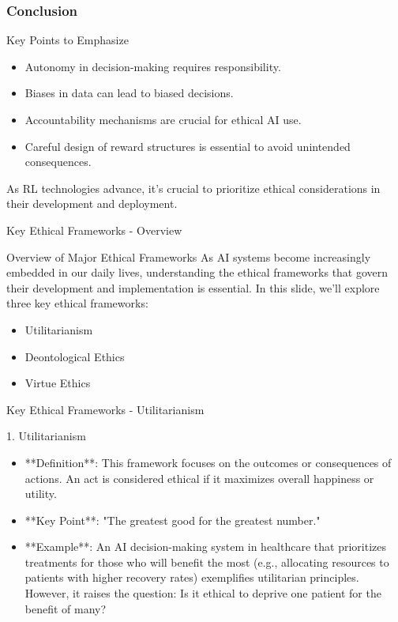 \documentclass[aspectratio=169]{beamer}
\begin{document}
\begin{frame}[fragile]
    \frametitle{Conclusion}
    \begin{block}{Key Points to Emphasize}
        \begin{itemize}
            \item Autonomy in decision-making requires responsibility.
            \item Biases in data can lead to biased decisions.
            \item Accountability mechanisms are crucial for ethical AI use.
            \item Careful design of reward structures is essential to avoid unintended consequences.
        \end{itemize}
    \end{block}
    As RL technologies advance, it's crucial to prioritize ethical considerations in their development and deployment.
\end{frame}

\begin{frame}[fragile]{Key Ethical Frameworks - Overview}
    \begin{block}{Overview of Major Ethical Frameworks}
        As AI systems become increasingly embedded in our daily lives, understanding the ethical frameworks that govern their development and implementation is essential. In this slide, we'll explore three key ethical frameworks: 
        \begin{itemize}
            \item Utilitarianism
            \item Deontological Ethics
            \item Virtue Ethics
        \end{itemize}
    \end{block}
\end{frame}

\begin{frame}[fragile]{Key Ethical Frameworks - Utilitarianism}
    \begin{block}{1. Utilitarianism}
        \begin{itemize}
            \item **Definition**: This framework focuses on the outcomes or consequences of actions. An act is considered ethical if it maximizes overall happiness or utility.
            \item **Key Point**: "The greatest good for the greatest number."
            \item **Example**: An AI decision-making system in healthcare that prioritizes treatments for those who will benefit the most (e.g., allocating resources to patients with higher recovery rates) exemplifies utilitarian principles. However, it raises the question: Is it ethical to deprive one patient for the benefit of many?
        \end{itemize}
    \end{block}
\end{frame}
\end{document}
